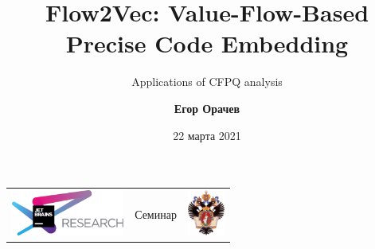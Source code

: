 \documentclass[xcolor=table,english]{beamer}
\title[Flow2Vec]{Flow2Vec: Value-Flow-Based Precise Code Embedding}
\subtitle[YaccConstructor]{Applications of CFPQ analysis}
\institute[СПбГУ]{
JetBrains Research, Лаборатория языковых инструментов  \\
Санкт-Петербургский Государственный университет
}
\author[Егор Орачев]{\textbf{Егор Орачев}}
\date{22 марта 2021}
\begin{document}
{
\begin{frame}[fragile]
  \begin{table}
  \centering
  \begin{tabularx}{\linewidth}{YcX}
    \includegraphics[height=1.5cm]{pictures/jetbrainsResearch.pdf} \hfill
    & \begin{minipage}[t]{0.3\textwidth}\center \vspace{-1cm}  Семинар
      \end{minipage}
    & \hfill \includegraphics[height=1.5cm]{pictures/SPbGU_Logo.png}
  \end{tabularx}
  \end{table}
  \titlepage
\end{frame}
}
\end{document}
